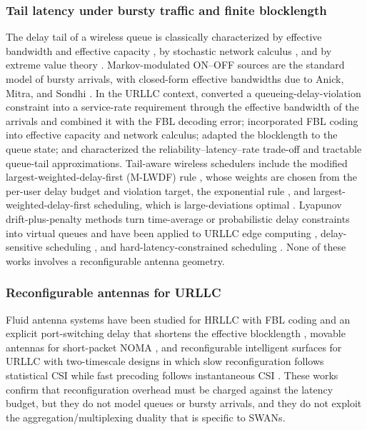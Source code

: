 \documentclass[journal]{IEEEtran}
\begin{document}
\subsubsection{Tail latency under bursty traffic and finite blocklength}
The delay tail of a wireless queue is classically characterized by effective bandwidth and effective capacity \cite{Chang1994,Kelly1996,Wu2003,Ozmen2016}, by stochastic network calculus \cite{Fidler2015,AlZubaidy2016,Schiessl2018}, and by extreme value theory \cite{Bennis2018,Liu2019MEC}. Markov-modulated ON--OFF sources are the standard model of bursty arrivals, with closed-form effective bandwidths due to Anick, Mitra, and Sondhi \cite{Anick1982,Elwalid1993}. In the URLLC context, \cite{She2018CrossLayer} converted a queueing-delay-violation constraint into a service-rate requirement through the effective bandwidth of the arrivals and combined it with the FBL decoding error; \cite{Gursoy2013,Schiessl2018} incorporated FBL coding into effective capacity and network calculus; \cite{Zhao2022QueueAware} adapted the blocklength to the queue state; and \cite{Li2024RLR,Li2024Tractable} characterized the reliability--latency--rate trade-off and tractable queue-tail approximations. Tail-aware wireless schedulers include the modified largest-weighted-delay-first (M-LWDF) rule \cite{Andrews2001}, whose weights are chosen from the per-user delay budget and violation target, the exponential rule \cite{Shakkottai2002EXP}, and largest-weighted-delay-first scheduling, which is large-deviations optimal \cite{Stolyar2001LWDF}. Lyapunov drift-plus-penalty methods \cite{Neely2010,Neely2013DelayNUM} turn time-average or probabilistic delay constraints into virtual queues and have been applied to URLLC edge computing \cite{Liu2019MEC}, delay-sensitive scheduling \cite{Zhang2024LyapunovMARL,Zanbouri2026}, and hard-latency-constrained scheduling \cite{Zhang2025HRL}. None of these works involves a reconfigurable antenna geometry.

\subsubsection{Reconfigurable antennas for URLLC}
Fluid antenna systems have been studied for HRLLC with FBL coding and an explicit port-switching delay that shortens the effective blocklength \cite{Zhu2026FASHRLLC,Zhang2025FBLFAS}, movable antennas for short-packet NOMA \cite{He2024MANOMA}, and reconfigurable intelligent surfaces for URLLC with two-timescale designs in which slow reconfiguration follows statistical CSI while fast precoding follows instantaneous CSI \cite{Hashemi2021RIS,Peng2024TwoTimescaleRIS}. These works confirm that reconfiguration overhead must be charged against the latency budget, but they do not model queues or bursty arrivals, and they do not exploit the aggregation/multiplexing duality that is specific to SWANs.
\end{document}
